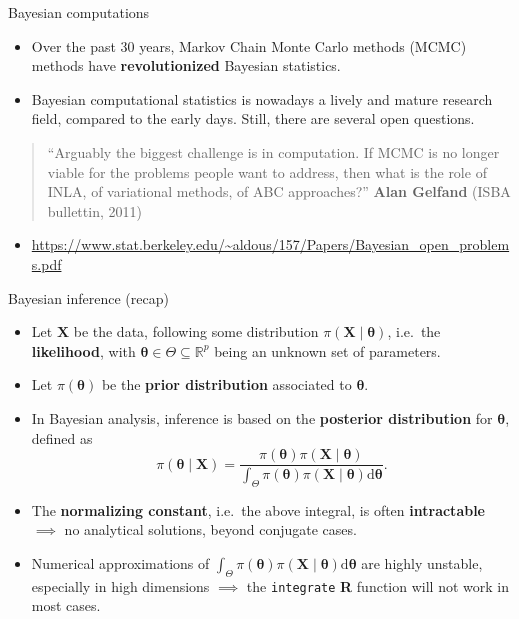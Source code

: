 \documentclass[
  9pt,
  ignorenonframetext,
]{beamer}
\providecommand{\tightlist}{%
  \setlength{\itemsep}{0pt}\setlength{\parskip}{0pt}}\usepackage{longtable,booktabs,array}
\begin{document}
\begin{frame}{Bayesian computations}
\protect\hypertarget{bayesian-computations}{}
\begin{itemize}
\item
  Over the past 30 years, Markov Chain Monte Carlo methods (MCMC)
  methods have \textbf{revolutionized} Bayesian statistics.
\item
  Bayesian computational statistics is nowadays a lively and mature
  research field, compared to the early days. Still, there are several
  open questions.
\end{itemize}

\begin{quote}
``Arguably the biggest challenge is in computation. If MCMC is no longer
viable for the problems people want to address, then what is the role of
INLA, of variational methods, of ABC approaches?'' \textbf{Alan Gelfand}
(ISBA bullettin, 2011)
\end{quote}

\begin{itemize}
\tightlist
\item
  \url{https://www.stat.berkeley.edu/~aldous/157/Papers/Bayesian_open_problems.pdf}
\end{itemize}
\end{frame}

\begin{frame}[fragile]{Bayesian inference (recap)}
\protect\hypertarget{bayesian-inference-recap}{}
\begin{itemize}
\item
  Let \(\bm{X}\) be the data, following some distribution
  \(\pi(\bm{X} \mid \bm{\theta})\), i.e.~the \textbf{likelihood}, with
  \(\bm{\theta} \in \Theta \subseteq \mathbb{R}^p\) being an unknown set
  of parameters.
\item
  Let \(\pi(\bm{\theta})\) be the \textbf{prior distribution} associated
  to \(\bm{\theta}\).
\item
  In Bayesian analysis, inference is based on the \textbf{posterior
  distribution} for \(\bm{\theta}\), defined as \[
  \pi(\bm{\theta} \mid \bm{X}) = \frac{\pi(\bm{\theta}) \pi(\bm{X} \mid \bm{\theta})}{\int_\Theta\pi(\bm{\theta}) \pi(\bm{X} \mid \bm{\theta}) \mathrm{d} \bm{\theta}}.
  \]
\item
  The \textbf{normalizing constant}, i.e.~the above integral, is often
  \textbf{intractable} \(\implies\) no analytical solutions, beyond
  conjugate cases.
\item
  Numerical approximations of
  \(\int_\Theta\pi(\bm{\theta}) \pi(\bm{X} \mid \bm{\theta}) \mathrm{d} \bm{\theta}\)
  are highly unstable, especially in high dimensions \(\implies\) the
  \texttt{integrate} \textbf{R} function will not work in most cases.
\end{itemize}
\end{frame}
\end{document}
